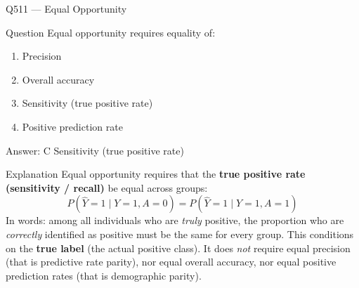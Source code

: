 \documentclass[aspectratio=169,8pt]{beamer}
\begin{document}
\begin{frame}{Q511 --- Equal Opportunity}
	\begin{block}{Question}
		Equal opportunity requires equality of:
		\begin{enumerate}
			\item Precision
			\item Overall accuracy
			\item Sensitivity (true positive rate)
			\item Positive prediction rate
		\end{enumerate}
	\end{block}
	\begin{exampleblock}{Answer: C}
		Sensitivity (true positive rate)
	\end{exampleblock}
	\begin{block}{Explanation}
		Equal opportunity requires that the \textbf{true positive rate (sensitivity / recall)}
		be equal across groups:
		\[
		P(\hat{Y} = 1 \mid Y = 1, A = 0) = P(\hat{Y} = 1 \mid Y = 1, A = 1)
		\]
		In words: among all individuals who are \emph{truly} positive,
		the proportion who are \emph{correctly} identified as positive must be the same
		for every group. This conditions on the \textbf{true label} (the actual positive class).
		It does \emph{not} require equal precision (that is predictive rate parity),
		nor equal overall accuracy, nor equal positive prediction rates
		(that is demographic parity).
	\end{block}
\end{frame}
\end{document}
